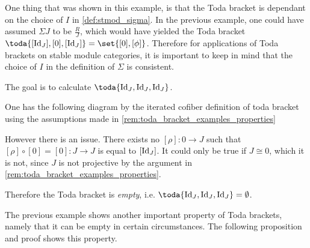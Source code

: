 One thing that was shown in this example, is that the Toda bracket is dependant on the choice of \( I \) in \autoref{def:stmod_sigma}. In the previous example, one could have assumed \( \Sigma J \) to be \( \frac{R}{J} \), which would have yielded the Toda bracket \( \toda{[\Id_J], [0], [\Id_J]} = \set{[0], [\phi]} \). Therefore for applications of Toda brackets on stable module categories, it is important to keep in mind that the choice of \( I \) in the definition of \( \Sigma \) is consistent.

\begin{example}
	\label{ex:toda_bracket-1}
	The goal is to calculate \( \toda{\Id_J, \Id_J, \Id_J} \).

	One has the following diagram by the iterated cofiber definition of toda bracket using the assumptions made in \autoref{rem:toda_bracket_examples_properties}
	\begin{center}
	\end{center}

	However there is an issue. There exists no \( [\rho]: 0 \to J \) such that \( [\rho] \circ [0] = [0]: J \to J \) is equal to \( [\operatorname{Id}_J] \). It could only be true if \( J \cong 0 \), which it is not, since \( J \) is not projective by the argument in \autoref{rem:toda_bracket_examples_properties}.

	Therefore the Toda bracket is \emph{empty}, i.e. \( \toda{\Id_J, \Id_J, \Id_J} = \emptyset \).
\end{example}

The previous example shows another important property of Toda brackets, namely that it can be empty in certain circumstances. The following proposition and proof shows this property.


